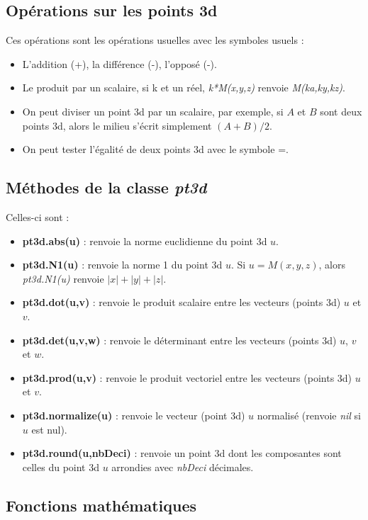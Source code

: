 \subsection{Opérations sur les points 3d}

Ces opérations sont les opérations usuelles avec les symboles usuels :
\begin{itemize}
    \item L'addition (+), la différence (-), l'opposé (-).
    \item Le produit par un scalaire, si k et un réel, \emph{k*M(x,y,z)} renvoie \emph{M(ka,ky,kz)}.
    \item On peut diviser un point 3d par un scalaire, par exemple, si $A$ et $B$ sont deux points 3d, alors le milieu s'écrit simplement $(A+B)/2$.
    \item On peut tester l'égalité de deux points 3d avec le symbole =.
\end{itemize}

\subsection{Méthodes de la classe \emph{pt3d}}

Celles-ci sont :
\begin{itemize}
    \item \textbf{pt3d.abs(u)} : renvoie la norme euclidienne du point 3d $u$.
    \item \textbf{pt3d.N1(u)} : renvoie la norme 1 du point 3d $u$. Si $u=M(x,y,z)$, alors \emph{pt3d.N1(u)} renvoie $|x|+|y|+|z|$.
    \item \textbf{pt3d.dot(u,v)} : renvoie le produit scalaire entre les vecteurs (points 3d) $u$ et $v$.
    \item \textbf{pt3d.det(u,v,w)} : renvoie le déterminant entre les vecteurs (points 3d) $u$, $v$ et $w$.
    \item \textbf{pt3d.prod(u,v)} : renvoie le produit vectoriel entre les vecteurs (points 3d) $u$ et $v$.
    \item \textbf{pt3d.normalize(u)} : renvoie le vecteur (point 3d) $u$ normalisé (renvoie \emph{nil} si $u$ est nul).
    \item \textbf{pt3d.round(u,nbDeci)} : renvoie un point 3d dont les composantes sont celles du point 3d $u$ arrondies avec \emph{nbDeci} décimales.
\end{itemize}

\subsection{Fonctions mathématiques}

